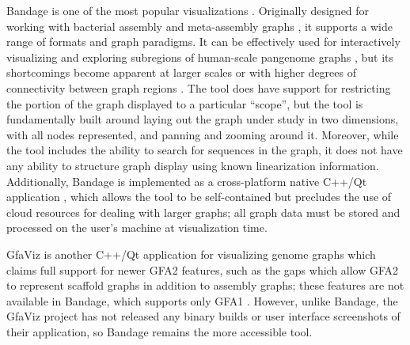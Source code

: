 Bandage \citep{Wick_2015} is one of the most popular visualizations \citep{Mikheenko_2019}.
Originally designed for working with bacterial assembly and meta-assembly graphs \citep{Wick_2015}, it supports a wide range of formats and graph  paradigms.
It can be effectively used for interactively visualizing and exploring subregions of human-scale pangenome graphs \citep{Garrison_2019}, but its shortcomings become apparent at larger scales or with higher degrees of connectivity between graph regions \citep{Mikheenko_2019}.
The tool does have support for restricting the portion of the graph displayed to a particular ``scope'', but the tool is fundamentally built around laying out the graph under study in two dimensions, with all nodes represented, and panning and zooming around it.
Moreover, while the tool includes the ability to search for sequences in the graph, it does not have any ability to structure graph display using known linearization information.
Additionally, Bandage is implemented as a cross-platform native C++/Qt application \citep{Wick_2015}, which allows the tool to be self-contained but precludes the use of cloud resources for dealing with larger graphs; all graph data must be stored and processed on the user's machine at visualization time.

GfaViz is another C++/Qt application for visualizing genome graphs which claims full support for newer GFA2 features, such as the gaps which allow GFA2 to represent scaffold graphs in addition to assembly graphs; these features are not available in Bandage, which supports only GFA1 \citep{Gonnella_2018}.
However, unlike Bandage, the GfaViz project has not released any binary builds or user interface screenshots of their application, so Bandage remains the more accessible tool.

